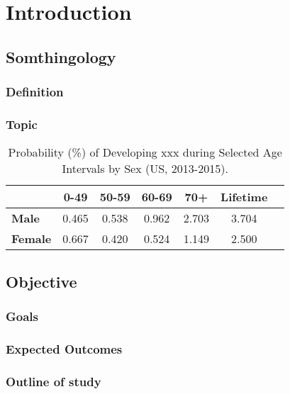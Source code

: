 \chapter{Introduction}

\section{Somthingology}
\blindtext

\subsection{Definition}
\blindtext
 
\subsection{Topic}
\blindtext

\begin{table}[H]
\centering
\caption{ Probability (\%) of Developing xxx during Selected Age Intervals by Sex (US, 2013-2015).}
\label{tabl:skin}
	\begin{tabular}{l c c c c c c} 
 		\toprule %
 		 & 0-49 & 50-59  & 60-69 & 70+ & Lifetime \\ [0.5ex] 
 		\midrule %
 		\textbf{Male} & 0.465 & 0.538 & 0.962 & 2.703 & 3.704\\ 
 		\textbf{Female} & 0.667 & 0.420 & 0.524 & 1.149 & 2.500\\
 		\bottomrule %
	\end{tabular}
\end{table} 


\section{Objective}
\blindtext 

\subsection{Goals}
\blindtext 


\subsection{Expected Outcomes}
\blindtext 

\subsection{Outline of study}
\blindtext 

